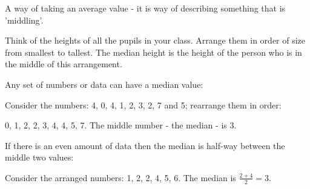 A way of taking an average value - it is way of describing something that is 'middling'.  
\par
Think of the heights of all the pupils in your class.  Arrange them in order of size from 
smallest to tallest.  The median height is the height of the person who is in the middle 
of this arrangement.
\par
Any set of numbers or data  can have a median value:
\par
Consider the numbers: 4, 0, 4, 1, 2, 3, 2, 7 and 5; rearrange them in order:
\par
0, 1, 2, 2, 3, 4, 4, 5, 7. The middle number - the median - is 3.
\par
If there is an even amount of data then the median is half-way between the 
middle two values:
\par
Consider the arranged numbers: 1, 2, 2, 4, 5, 6. The median is $ \frac{2+4}{2} = 3. $